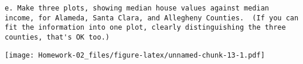 \documentclass[
]{article}
\newenvironment{Shaded}{\begin{snugshade}}{\end{snugshade}}
\newcommand{\DataTypeTok}[1]{\textcolor[rgb]{0.13,0.29,0.53}{#1}}
\newcommand{\DecValTok}[1]{\textcolor[rgb]{0.00,0.00,0.81}{#1}}
\newcommand{\KeywordTok}[1]{\textcolor[rgb]{0.13,0.29,0.53}{\textbf{#1}}}
\newcommand{\NormalTok}[1]{#1}
\newcommand{\OperatorTok}[1]{\textcolor[rgb]{0.81,0.36,0.00}{\textbf{#1}}}
\newcommand{\StringTok}[1]{\textcolor[rgb]{0.31,0.60,0.02}{#1}}
\begin{document}
\begin{Shaded}
\begin{Highlighting}[]
{{{{{\NormalTok{cor_Allegheny=ca_pa }\OperatorTok{%>%}\StringTok{ }\KeywordTok{mutate}\NormalTok{(}\DataTypeTok{pr=}\NormalTok{Built_}\DecValTok{2005}\NormalTok{_or_later}\OperatorTok{/}\NormalTok{Total_units) }\OperatorTok{%>%}\StringTok{ }\KeywordTok{filter}\NormalTok{(STATEFP}\OperatorTok{==}\DecValTok{42}\NormalTok{,COUNTYFP}\OperatorTok{==}\DecValTok{3}\NormalTok{) }\OperatorTok{%>%}\StringTok{ }\KeywordTok{summarise}\NormalTok{(}\KeywordTok{cor}\NormalTok{(pr,Median_house_value))}
\end{Highlighting}
\end{Shaded}

\begin{verbatim}
e. Make three plots, showing median house values against median income, for Alameda, Santa Clara, and Allegheny Counties.  (If you can fit the information into one plot, clearly distinguishing the three counties, that's OK too.)
\end{verbatim}

\begin{Shaded}
\end{Shaded}

\texttt{[image: Homework-02\_files/figure-latex/unnamed-chunk-13-1.pdf]}

\begin{Shaded}
\end{Shaded}
\end{document}
